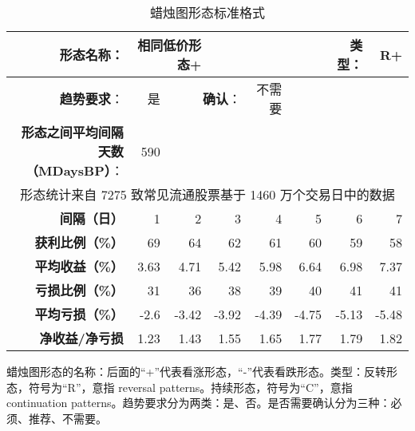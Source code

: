 \begin{table}[!ht]
    \centering
    \caption{蜡烛图形态标准格式}
    \begin{tabular}{|r|r|r|r|r|r|r|r|}
        \hline
        \textbf{形态名称}：                & \multicolumn{2}{r}{相同低价形态+} & ~                                 & ~     & ~     & \textbf{类型}： & R+            \\ \hline
        \textbf{趋势要求}：                & 是                           & \multicolumn{2}{r|}{\textbf{确认}：} & 不需要   & ~     & ~            & ~             \\ \hline
        \textbf{形态之间平均间隔天数（MDaysBP）}： & 590                         & ~                                 & ~     & ~     & ~            & ~     & ~     \\ \hline
        \multicolumn{8}{|c|}{形态统计来自 7275 致常见流通股票基于 1460 万个交易日中的数据}                                                                                     \\ \hline
        \textbf{间隔（日）}                & 1                           & 2                                 & 3     & 4     & 5            & 6     & 7     \\ \hline
        \textbf{获利比例（\%）}             & 69                          & 64                                & 62    & 61    & 60           & 59    & 58    \\ \hline
        \textbf{平均收益（\%）}             & 3.63                        & 4.71                              & 5.42  & 5.98  & 6.64         & 6.98  & 7.37  \\ \hline
        \textbf{亏损比例（\%）}             & 31                          & 36                                & 38    & 39    & 40           & 41    & 41    \\ \hline
        \textbf{平均亏损（\%）}             & -2.6                        & -3.42                             & -3.92 & -4.39 & -4.75        & -5.13 & -5.48 \\ \hline
        \textbf{净收益/净亏损 }             & 1.23                        & 1.43                              & 1.55  & 1.65  & 1.77         & 1.79  & 1.82  \\ \hline
    \end{tabular}
\end{table}

蜡烛图形态的名称：后面的“+”代表看涨形态，“-”代表看跌形态。类型：反转形态，符号为“R”，意指 reversal patterns。持续形态，符号为“C”，意指 continuation patterns。趋势要求分为两类：是、否。是否需要确认分为三种：必须、推荐、不需要。

